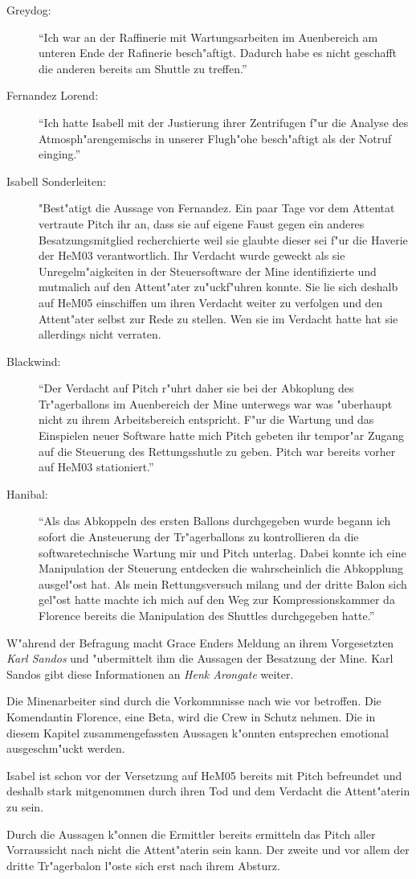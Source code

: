 \begin{description}
	\item[Greydog:] "`Ich war an der Raffinerie mit Wartungsarbeiten im Au\3enbereich am unteren Ende der Rafinerie besch"aftigt. Dadurch habe es nicht geschafft die anderen bereits am Shuttle zu treffen."'
	\item[Fernandez Lorend:] "`Ich hatte Isabell mit der Justierung ihrer Zentrifugen f"ur die Analyse des Atmosph"arengemischs in unserer Flugh"ohe besch"aftigt als der Notruf einging."'
	\item[Isabell Sonderleiten:] "Best"atigt die Aussage von Fernandez. Ein paar Tage vor dem Attentat vertraute Pitch ihr an, dass sie auf eigene Faust gegen ein anderes Besatzungsmitglied recherchierte weil sie glaubte dieser sei f"ur die Haverie der HeM03 verantwortlich. Ihr Verdacht wurde geweckt als sie Unregelm"a\3igkeiten in der Steuersoftware der Mine identifizierte und mutma\3lich auf den Attent"ater zu"uckf"uhren konnte. Sie lie\3 sich deshalb auf HeM05 einschiffen um ihren Verdacht weiter zu verfolgen und den Attent"ater selbst zur Rede zu stellen. Wen sie im Verdacht hatte hat sie allerdings nicht verraten. 
	\item[Blackwind:] "`Der Verdacht auf Pitch r"uhrt daher sie bei der Abkoplung des Tr"agerballons im Au\3enbereich der Mine unterwegs war was "uberhaupt nicht zu ihrem Arbeitsbereich entspricht. F"ur die Wartung und das Einspielen neuer Software hatte mich Pitch gebeten ihr tempor"ar Zugang auf die Steuerung des Rettungsshutle zu geben. Pitch war bereits vorher auf HeM03 stationiert."'
	\item[Hanibal:] "`Als das Abkoppeln des ersten Ballons durchgegeben wurde begann ich sofort die Ansteuerung der Tr"agerballons zu kontrollieren da die softwaretechnische Wartung mir und Pitch unterlag. Dabei konnte ich eine Manipulation der Steuerung entdecken die wahrscheinlich die Abkopplung ausgel"ost hat. Als mein Rettungsversuch mi\3lang und der dritte Balon sich gel"ost hatte machte ich mich auf den Weg zur Kompressionskammer da Florence bereits die Manipulation des Shuttles durchgegeben hatte."'
\end{description}

W"ahrend der Befragung macht Grace Enders Meldung an ihrem Vorgesetzten \emph{Karl Sandos} und "ubermittelt ihm die Aussagen der Besatzung der Mine. Karl Sandos gibt diese Informationen an \emph{Henk Arongate} weiter.

\begin{remarks}
	Die Minenarbeiter sind durch die Vorkommnisse nach wie vor betroffen. Die Komendantin Florence, eine Beta, wird die Crew in Schutz nehmen. Die in diesem Kapitel zusammengefassten Aussagen k"onnten entsprechen emotional ausgeschm"uckt werden. 

	Isabel ist schon vor der Versetzung auf HeM05 bereits mit Pitch befreundet und deshalb stark mitgenommen durch ihren Tod und dem Verdacht die Attent"aterin zu sein.

	Durch die Aussagen k"onnen die Ermittler bereits ermitteln das Pitch aller Vorraussicht nach nicht die Attent"aterin sein kann. Der zweite und vor allem der dritte Tr"agerbalon l"oste sich erst nach ihrem Absturz.		
\end{remarks}

